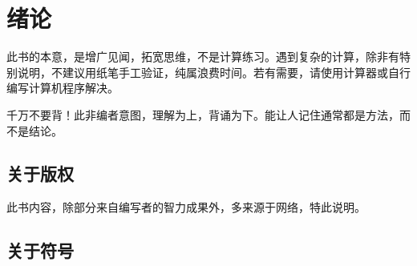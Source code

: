 
\chapter{绪论}
\label{chap:introduction}

此书的本意，是增广见闻，拓宽思维，不是计算练习。遇到复杂的计算，除非有特别说明，不建议用纸笔手工验证，纯属浪费时间。若有需要，请使用计算器或自行编写计算机程序解决。

千万不要背！此非编者意图，理解为上，背诵为下。能让人记住通常都是方法，而不是结论。

\section{关于版权}
\label{sec:copyright}

此书内容，除部分来自编写者的智力成果外，多来源于网络，特此说明。

\section{关于符号}
\label{sec:symbol}


